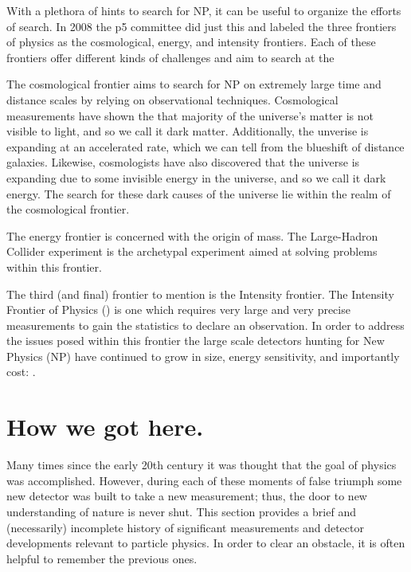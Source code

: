 With a plethora of hints to search for NP, it can be useful to organize the efforts of search.
In 2008 the p5 committee did just this and labeled the three frontiers of physics as the cosmological, energy, and intensity frontiers.
Each of these frontiers offer different kinds of challenges and aim to search at the

The cosmological frontier aims to search for NP on extremely large time and distance scales by relying on observational techniques.
Cosmological measurements have shown the that majority of the universe's matter is not visible to light, and so we call it dark matter.
Additionally, the unverise is expanding at an accelerated rate, which we can tell from the blueshift of distance galaxies.
Likewise, cosmologists have also discovered that the universe is expanding due to some invisible energy in the universe, and so we call it dark energy.
The search for these dark causes of the universe lie within the realm of the cosmological frontier.

The energy frontier is concerned with the origin of mass.
The Large-Hadron Collider experiment is the archetypal experiment aimed at solving problems within this frontier.

The third (and final) frontier to mention is the Intensity frontier.
The Intensity Frontier of Physics (\citep{intensityfrontier2012_Hewett}) is one which requires very large and very precise measurements to gain the statistics to declare an observation.
In order to address the issues posed within this frontier the large scale detectors hunting for New Physics (NP) have continued to grow in size, energy sensitivity, and importantly cost: \citep{Juno:2022103927}.


\section{How we got here.}

Many times since the early 20th century it was thought that the goal of physics was accomplished.
However, during each of these moments of false triumph some new detector was built to take a new measurement; thus, the door to new understanding of nature is never shut.
This section provides a brief and (necessarily) incomplete history of significant measurements and detector developments relevant to particle physics.
In order to clear an obstacle, it is often helpful to remember the previous ones.


